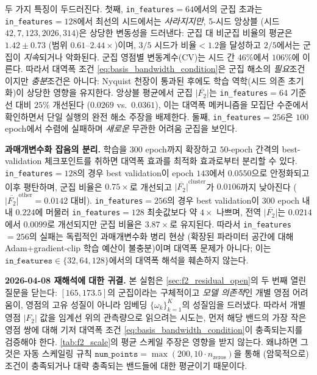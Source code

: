 \documentclass[11pt, a4paper]{article}
\theoremstyle{definition}
\theoremstyle{plain}
\begin{document}
\noindent 두 가지 특징이 두드러진다. 첫째, \texttt{in\_features}$=64$에서의 군집 초과는 \texttt{in\_features}$=128$에서 최선의 시드에서는 \emph{사라지지만}, 5-시드 앙상블 (시드 $42, 7, 123, 2026, 314$)은 상당한 변동성을 드러낸다: 군집 대 비군집 비율의 평균은 $1.42\pm0.73$ (범위 $0.61$--$2.44\times$)이며, $3/5$ 시드가 비율${}<1.2$을 달성하고 $2/5$에서는 군집이 \emph{지속}되거나 악화된다. 군집 영점별 변동계수(CV)는 시드 간 $46\%$에서 $106\%$에 이른다. 따라서 대역폭 조건 \eqref{eq:basis_bandwidth_condition}은 군집 해소의 \emph{필요}조건이지만 \emph{충분}조건은 아니다: Nyquist 천장이 통과된 후에도 학습 역학(시드 의존 초기화)이 상당한 영향을 유지한다. 앙상블 평균에서 군집 $\overline{|F_2|}$는 \texttt{in\_features}$=64$ 기준선 대비 $25\%$ 개선된다 ($0.0269$ vs.\ $0.0361$), 이는 대역폭 메커니즘을 모집단 수준에서 확인하면서 단일 실행의 완전 해소 주장을 배제한다. 둘째, \texttt{in\_features}$=256$은 $100$ epoch에서 수렴에 실패하며 \emph{새로운} 무관한 어려움 군집을 보인다.

\smallskip
\noindent\textbf{과매개변수화 잡음의 분리.} 학습을 $300$ epoch까지 확장하고 $50$-epoch 간격의 best-validation 체크포인트를 취하면 대역폭 효과를 최적화 효과로부터 분리할 수 있다. \texttt{in\_features}$=128$의 경우 best validation이 epoch $143$에서 $0.0550$으로 안정화되고 이후 평탄하며, 군집 비율은 $0.75\times$로 개선되고 $\overline{|F_2|}^{\mathrm{cluster}}$가 $0.0106$까지 낮아진다 ($\overline{|F_2|}^{\mathrm{other}}=0.0142$ 대비). \texttt{in\_features}$=256$의 경우 best validation이 $300$ epoch 내내 $0.224$에 머물러 \texttt{in\_features}$=128$ 최솟값보다 약 $4\times$ 나쁘며, 전역 $\overline{|F_2|}$는 $0.0214$에서 $0.0099$로 개선되지만 군집 비율은 $3.87\times$로 유지된다. 따라서 \texttt{in\_features}$=256$의 실패는 독립적인 과매개변수화 병리 현상 (확장된 파라미터 공간에 대해 Adam+gradient-clip 학습 예산이 불충분)이며 대역폭 문제가 아니다; 이는 $\texttt{in\_features}\in\{32,64,128\}$에서의 대역폭 해석을 훼손하지 않는다.

\smallskip
\noindent\textbf{2026-04-08 재해석에 대한 귀결.} 본 실험은 \cref{sec:f2_residual_open}의 두 번째 열린 질문을 닫는다: $[165,173.5]$의 군집이라는 구체적이고 \emph{모델 의존적}인 개별 영점 어려움이, 영점의 고유 성질이 아니라 임베딩 $\{\omega_k\}_{k=1}^{K}$의 성질임을 드러냈다. 따라서 개별 영점 $|F_2|$ 값을 임계선 위의 관측량으로 읽으려는 시도는, 먼저 해당 밴드의 가장 작은 영점 쌍에 대해 기저 대역폭 조건 \eqref{eq:basis_bandwidth_condition}이 충족되는지를 검증해야 한다. \cref{tab:f2_scale}의 평균 스케일 주장은 영향을 받지 않는다. 왜냐하면 그것은 자동 스케일링 규칙 $\texttt{num\_points}=\max(200,10\cdot n_{\mathrm{zeros}})$을 통해 (암묵적으로) 조건이 충족되거나 대략 충족되는 밴드들에 대한 평균이기 때문이다.
\end{document}
